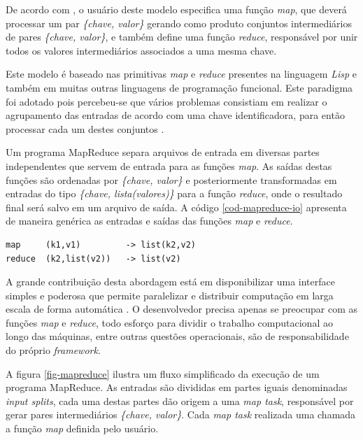 De acordo com , o usuário deste modelo especifica uma função \textit{map}, que deverá processar um par \textit{\{chave, valor\}} gerando como produto conjuntos  intermediários de pares \textit{\{chave, valor\}}, e também define uma função \textit{reduce}, responsável por unir todos os valores intermediários associados a uma mesma chave.

Este modelo é baseado nas primitivas \textit{map} e \textit{reduce} presentes na linguagem \textit{Lisp} e também em muitas outras linguagens de programação funcional. Este paradigma foi adotado pois percebeu-se que vários problemas consistiam em realizar o agrupamento das entradas de acordo com uma chave identificadora, para então processar cada um destes conjuntos \cite{ghemawatMapreduce2008}.

Um programa MapReduce separa arquivos de entrada em diversas partes independentes que servem de entrada para as funções \textit{map}. As saídas destas funções são ordenadas por \textit{\{chave, valor\}} e posteriormente transformadas em entradas do tipo \textit{\{chave, lista(valores)\}} para a função \textit{reduce}, onde o resultado final será salvo em um arquivo de saída. A código \ref{cod-mapreduce-io} apresenta de maneira genérica as entradas e saídas das funções \textit{map} e \textit{reduce}.

\begin{lstlisting}[style=abnt,frame=single, 
		caption={Entradas e saídas - MapReduce, extraído de 
		\citeonline{ghemawatMapreduce2008}}, 
		label=cod-mapreduce-io]
map     (k1,v1)         -> list(k2,v2)
reduce  (k2,list(v2))   -> list(v2)
\end{lstlisting}
\FloatBarrier

A grande contribuição desta abordagem está em disponibilizar uma interface simples e poderosa que permite paralelizar e distribuir computação em larga escala de forma automática \cite{ghemawatMapreduce2008}. O desenvolvedor precisa apenas se preocupar com as funções \textit{map} e \textit{reduce}, todo esforço para dividir o trabalho computacional ao longo das máquinas, entre outras questões operacionais, são de responsabilidade do próprio \textit{framework}.

A figura \ref{fig-mapreduce} ilustra um fluxo simplificado da execução de um programa MapReduce. As entradas são divididas em partes iguais denominadas \textit{input splits}, cada uma destas partes dão origem a uma \textit{map task}, responsável por gerar pares intermediários \textit{\{chave, valor\}}. Cada \textit{map task} realizada uma chamada a função \textit{map} definida pelo usuário.

